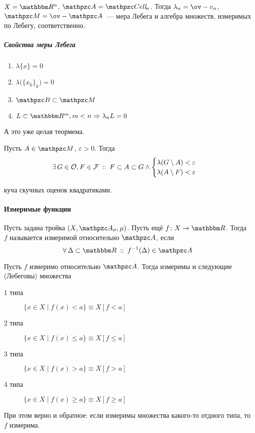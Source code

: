 \documentclass[12pt, timbord]{longnotes}
\begin{document}
\begin{defn}\label{defn:meas::ledeg::lebeg}
  $X=\R^n$, $\alg= \Cell_n$. Тогда $\lambda_n = \ov-{v_n}$, $\mathpzc M = \ov-{\alg}$~--- мера
  Лебега и алгебра множеств, измеримых по Лебегу, соответственно.
\end{defn}

\subparagraph{Свойства меры Лебега}

\begin{enumerate}[(1) $\triangleright$]
  \item $\lambda \{x\} = 0$
  \item $\lambda \bigl(\{x_k\}_{k}\bigr) = 0$
  \item $\borel \subset \lebesgue$
  \item $L \subset \R^m, m<n \Rightarrow \lambda_n L  = 0$
\end{enumerate}

А это уже целая теормема.
\begin{thrm}\label{thrm:meas::ledeg::reg}
  Пусть $A \in \lebesgue$, $\varepsilon > 0$. Тогда 
  \[
    \exists\, G \in \mathcal O, F \in \mathcal F \:::\: F \subset A \subset G \land 
    \begin{cases}
      \lambda(G \setminus A) < \varepsilon \\
      \lambda(A \setminus F) < \varepsilon 
    \end{cases}
  \]
\end{thrm}
\begin{tproof}
  куча скучных оценок квадратиками.
\end{tproof}


\paragraph{Измеримые функции}
\label{par:meas::mfun}

\begin{defn}\label{defn:meas::mfun}
  Пусть задана тройка $(X, \alg_\sigma, \mu)$. Пусть ещё $f\colon X \to \R$. Тогда 
  $f$ называется измеримой относительно $\alg$, если 
  \[
    \forall\, \Delta \subset \R  \holds f^{-1} (\Delta) \in \alg
  \]
\end{defn}

\begin{thrm}\label{thrm:meas::mfun::diftyps}
  Пусть $f$ измеримо относительно $\alg$. Тогда измеримы и следующие (Лебеговы) множества
  \begin{description}
    \item[1 типа] $\{x \in X \mid f(x) < a\} \equiv X [f < a]$
    \item[2 типа] $\{x \in X \mid f(x) \leqslant a\} \equiv X [f \leqslant a]$
    \item[3 типа] $\{x \in X \mid f(x) > a\} \equiv X [f > a]$
    \item[4 типа] $\{x \in X \mid f(x) \geqslant a\} \equiv X [f \geqslant a]$
  \end{description}
  При этом верно и обратное: если измеримы множества какого-то отдного типа, то
  $f$ измерима.
\end{thrm}
\end{document}
